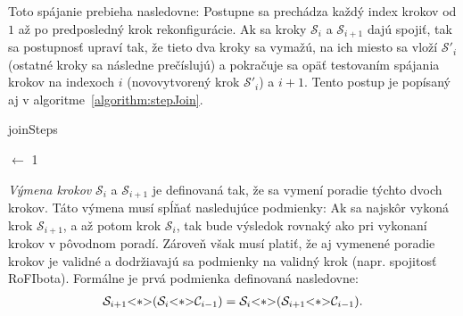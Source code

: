\documentclass[
  digital, %
  oneside, %
  notable,   %
  lof,     %
  nolot,     %
]{fithesis3}
\begin{document}
Toto spájanie prebieha nasledovne: Postupne sa prechádza každý index krokov od $1$ až po predposledný krok rekonfigurácie. Ak sa kroky $\mathcal{S}_i$ a $\mathcal{S}_{i + 1}$ dajú spojiť, tak sa postupnosť upraví tak, že tieto dva kroky sa vymažú, na ich miesto sa vloží $\mathcal{S}'_i$ (ostatné kroky sa následne prečíslujú) a pokračuje sa opäť testovaním spájania krokov na indexoch $i$ (novovytvorený krok $\mathcal{S}'_i$) a $i + 1$. Tento postup je popísaný aj v algoritme~\ref{algorithm:stepJoin}. 

\begin{algorithm}
    \caption{joinSteps}
    \label{algorithm:stepJoin}
    \DontPrintSemicolon
    
    \CurrIndex $\leftarrow$ 1\;
\end{algorithm}

\textit{Výmena krokov} $\mathcal{S}_i$ a $\mathcal{S}_{i + 1}$ je definovaná tak, že sa vymení poradie týchto dvoch krokov. Táto výmena musí spĺňať nasledujúce podmienky: Ak sa najskôr vykoná krok $\mathcal{S}_{i + 1}$, a až potom krok $\mathcal{S}_i$, tak bude výsledok rovnaký ako pri vykonaní krokov v pôvodnom poradí. Zároveň však musí platiť, že aj vymenené poradie krokov je validné a dodržiavajú sa podmienky na validný krok (napr. spojitosť RoFIbota). Formálne je prvá podmienka definovaná nasledovne: 
\begin{align}
\label{align:stepSwap}
\mathcal{S}_{i + 1} \lstinline{<*>} (\mathcal{S}_i \lstinline{<*>} \mathcal{C}_{i - 1}) = \mathcal{S}_i \lstinline{<*>} (\mathcal{S}_{i + 1} \lstinline{<*>} \mathcal{C}_{i - 1}). 
\end{align}
\end{document}

